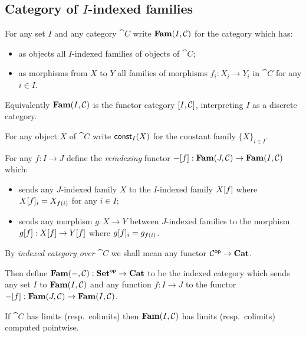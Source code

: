 \subsection{Category of $I$-indexed families}
\label{sec:fam}

\begin{definition}
\label{def:fam:Fam}
For any set $I$ and any category $\cat{C}$ write $\mathbf{Fam}(I,\mathcal{C})$ for the category which has:
\begin{itemize}
\item as objects all $I$-indexed families of objects of $\cat{C}$;
\item as morphisms from $X$ to $Y$ all families of morphisms $f_i: X_i \to Y_i$ in $\cat{C}$ for any $i \in
I$.
\end{itemize}
\end{definition}

\noindent Equivalently $\mathbf{Fam}(I,\mathcal{C})$ is the functor category $[I,\mathcal{C}]$, interpreting $I$ as a
discrete category.

\begin{definition}
For any object $X$ of $\cat{C}$ write $\mathsf{const}_I(X)$ for the constant family $\{X\}_{i \in I}$.
\end{definition}

\begin{definition}[Reindexing]
For any $f: I \to J$ define the \emph{reindexing} functor $-[f]: \mathbf{Fam}(J,\mathcal{C}) \to
\mathbf{Fam}(I,\mathcal{C})$ which:
\begin{itemize}
\item sends any $J$-indexed family $X$ to the $I$-indexed family $X[f]$ where $X[f]_i =
X_{f(i)}$ for any $i \in I$;
\item sends any morphism $g: X \to Y$ between $J$-indexed families to the morphism $g[f]:
X[f] \to Y[f]$ where $g[f]_i = g_{f(i)}$.
\end{itemize}
\end{definition}

By \emph{indexed category over $\cat{C}$} we shall mean any functor $\mathcal{C}^{\mathsf{op}} \to \mathbf{Cat}$.

\begin{definition}
Then define $\mathbf{Fam}(-,\mathcal{C}): \mathbf{Set}^{\mathsf{op}} \to \mathbf{Cat}$ to be the indexed category which sends any set $I$ to
$\mathbf{Fam}(I,\mathcal{C})$ and any function $f: I \to J$ to the functor $-[f]: \mathbf{Fam}(J,\mathcal{C}) \to
\mathbf{Fam}(I,\mathcal{C})$.
\end{definition}

\begin{proposition}
If $\cat{C}$ has limits (resp.~colimits) then $\mathbf{Fam}(I,\mathcal{C})$ has limits (resp.~colimits) computed
pointwise.
\end{proposition}
